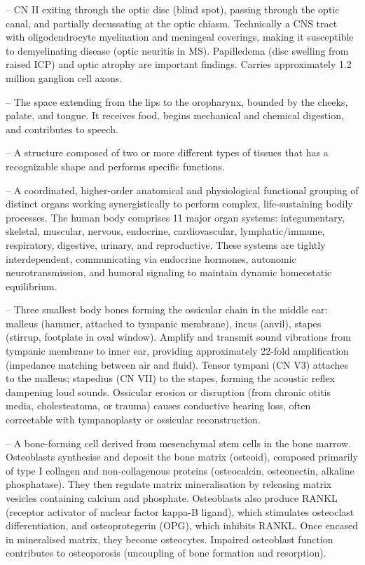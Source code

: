 -- CN II exiting through the optic disc (blind spot), passing through the optic canal, and partially decussating at the optic chiasm. Technically a CNS tract with oligodendrocyte myelination and meningeal coverings, making it susceptible to demyelinating disease (optic neuritis in MS). Papilledema (disc swelling from raised ICP) and optic atrophy are important findings. Carries approximately 1.2 million ganglion cell axons.

-- The space extending from the lips to the oropharynx, bounded by the cheeks, palate, and tongue. It receives food, begins mechanical and chemical digestion, and contributes to speech.

-- A structure composed of two or more different types of tissues that has a recognizable shape and performs specific functions.

-- A coordinated, higher-order anatomical and physiological functional grouping of distinct organs working synergistically to perform complex, life-sustaining bodily processes. The human body comprises 11 major organ systems: integumentary, skeletal, muscular, nervous, endocrine, cardiovascular, lymphatic/immune, respiratory, digestive, urinary, and reproductive. These systems are tightly interdependent, communicating via endocrine hormones, autonomic neurotransmission, and humoral signaling to maintain dynamic homeostatic equilibrium.

-- Three smallest body bones forming the ossicular chain in the middle ear: malleus (hammer, attached to tympanic membrane), incus (anvil), stapes (stirrup, footplate in oval window). Amplify and transmit sound vibrations from tympanic membrane to inner ear, providing approximately 22-fold amplification (impedance matching between air and fluid). Tensor tympani (CN V3) attaches to the malleus; stapedius (CN VII) to the stapes, forming the acoustic reflex dampening loud sounds. Ossicular erosion or disruption (from chronic otitis media, cholesteatoma, or trauma) causes conductive hearing loss, often correctable with tympanoplasty or ossicular reconstruction.

-- A bone-forming cell derived from mesenchymal stem cells in the bone marrow. Osteoblasts synthesise and deposit the bone matrix (osteoid), composed primarily of type I collagen and non-collagenous proteins (osteocalcin, osteonectin, alkaline phosphatase). They then regulate matrix mineralisation by releasing matrix vesicles containing calcium and phosphate. Osteoblasts also produce RANKL (receptor activator of nuclear factor kappa-B ligand), which stimulates osteoclast differentiation, and osteoprotegerin (OPG), which inhibits RANKL. Once encased in mineralised matrix, they become osteocytes. Impaired osteoblast function contributes to osteoporosis (uncoupling of bone formation and resorption).

